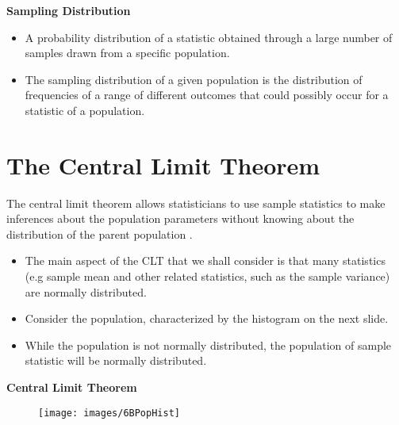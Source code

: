 \documentclass[]{report}
\begin{document}


\noindent \textbf{Sampling Distribution}
\begin{itemize}

\item A probability distribution of a statistic obtained through a large number of samples drawn from a specific population. 
\item The sampling distribution of a given population is the distribution of frequencies of a range of different outcomes 
that could possibly occur for a statistic of a population. 
\end{itemize}

\section{The Central Limit Theorem}
The central limit theorem allows statisticians to use sample statistics to make inferences about the population parameters without knowing about the distribution of the parent population .




\begin{itemize}
\item The main aspect of the CLT that we shall consider is that many statistics (e.g sample mean and other related statistics, such as the sample variance) are normally distributed.
\item Consider the population, characterized by the histogram on the next slide.
\item While the population is not normally distributed, the population of sample statistic will be normally distributed.
\end{itemize}


\textbf{Central Limit Theorem}
\begin{figure}
\texttt{[image: images/6BPopHist]}\\

\end{figure}


\end{document}
